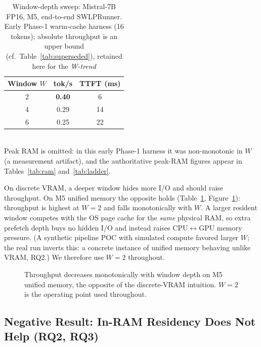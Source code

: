 \documentclass[10pt,a4paper]{article}
\begin{document}
\begin{table}[htbp]
\centering
\caption{Window-depth sweep: Mistral-7B FP16, M5, end-to-end SWLPRunner.
Early Phase-1 warm-cache harness (16 tokens); absolute throughput is an upper
bound (cf.\ Table~\ref{tab:superseded}), retained here for the \emph{W-trend}}
\label{tab:window}
\begin{tabular}{@{}ccc@{}}
\toprule
\textbf{Window $W$} & \textbf{tok/s} & \textbf{TTFT (ms)} \\
\midrule
2 & \textbf{0.40} & 6 \\
4 & 0.29 & 14 \\
6 & 0.25 & 22 \\
\bottomrule
\end{tabular}
\\[0.3em]
{\small Peak RAM is omitted: in this early Phase-1 harness it was non-monotonic in
$W$ (a measurement artifact), and the authoritative peak-RAM figures appear in
Tables~\ref{tab:ram} and~\ref{tab:ladder}.}
\end{table}

On discrete VRAM, a deeper window hides more I/O and should raise throughput.
On M5 unified memory the opposite holds (Table~\ref{tab:window},
Figure~\ref{fig:window}): throughput is highest at $W=2$ and falls monotonically
with $W$. A larger resident window competes with the OS page cache for the
\emph{same} physical RAM, so extra prefetch depth buys no hidden I/O and instead
raises CPU$\leftrightarrow$GPU memory pressure. (A synthetic pipeline POC with
simulated compute favored larger $W$; the real run inverts this: a concrete
instance of unified memory behaving unlike VRAM, RQ2.) We therefore use $W=2$
throughout.

\begin{figure}[htbp]
\centering
{}
\caption{Throughput decreases monotonically with window depth on M5 unified
memory, the opposite of the discrete-VRAM intuition. $W=2$ is the operating
point used throughout.}
\label{fig:window}
\end{figure}

\subsection{Negative Result: In-RAM Residency Does Not Help (RQ2, RQ3)}
\label{subsec:residency}
\end{document}
